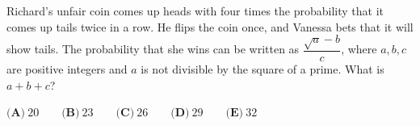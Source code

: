 Richard's unfair coin comes up heads with four times the probability that it comes up tails twice in a row. He flips the coin once, and Vanessa bets that it will show tails. The probability that she wins can be written as $\dfrac{\sqrt a-b}c$, where $a,b,c$ are positive integers and $a$ is not divisible by the square of a prime. What is $a+b+c$?

$\textbf{(A)}\ 20\qquad\textbf{(B)}\ 23\qquad\textbf{(C)}\ 26\qquad\textbf{(D)}\ 29\qquad\textbf{(E)}\ 32$
